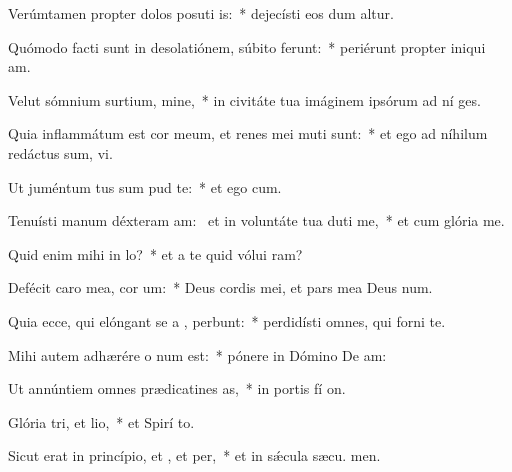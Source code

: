 \item Verúmtamen propter dolos posuti is:~* dejecísti eos dum altur.
\item Quómodo facti sunt in desolatiónem, súbito ferunt:~* periérunt propter iniqui am.
\item Velut sómnium surtium, mine,~* in civitáte tua imáginem ipsórum ad ní ges.
\item Quia inflammátum est cor meum, et renes mei muti sunt:~* et ego ad níhilum redáctus sum,  vi.
\item Ut juméntum tus sum pud te:~* et ego  cum.
\item Tenuísti manum déxteram am:~\pscross{} et in voluntáte tua duti me,~* et cum glória  me.
\item Quid enim mihi  in lo?~* et a te quid vólui  ram?
\item Defécit caro mea,  cor um:~* Deus cordis mei, et pars mea Deus  num.
\item Quia ecce, qui elóngant se a , perbunt:~* perdidísti omnes, qui forni  te.
\item Mihi autem adhærére o num est:~* pónere in Dómino De  am:
\item Ut annúntiem omnes prædicatines as,~* in portis fí on.
\item Glória tri, et lio,~* et Spirí to.
\item Sicut erat in princípio, et , et per,~* et in sǽcula sæcu. men.
